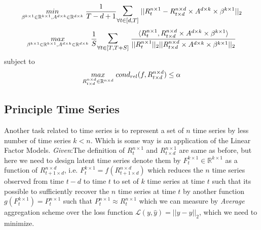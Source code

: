 \begin{equation} \label{lfm_loss}
\underset{\beta^{k \times 1}\in \mathbb{R}^{k\times 1}, A^{d\times k} \in \mathbb{R}^{d\times k}}{min}\hspace{1mm} \frac{1}{T-d+1} \mathlarger{\mathlarger{\sum}}_{\forall t\in [d,T]} \hspace{1mm} ||R^{n\times 1}_t-R^{n\times d}_{t\times d}\times A^{d\times k} \times \beta^{k \times 1}||_2
\end{equation}
\begin{equation} \label{lfm_reward}
\underset{\beta^{k \times 1}\in \mathbb{R}^{k\times 1}, A^{d\times k} \in \mathbb{R}^{d\times k}}{max}\hspace{1mm} \frac{1}{S} \mathlarger{\mathlarger{\sum}}_{\forall t\in [T,T+S]} \hspace{1mm} \frac{\langle R^{n\times 1}_t,R^{n\times d}_{t\times d}\times A^{d\times k} \times \beta^{k \times 1}\rangle}{||R^{n\times 1}_t||_2||R^{n\times d}_{t\times d}\times A^{d\times k} \times \beta^{k \times 1}||_2}
\end{equation}
subject to
\begin{equation} \label{lfm_cond}
\underset{R^{n\times d}_{t\times d} \in \mathbb{R}^{n\times d}}{max}\hspace{1mm} cond_{rel}(f,R^{n\times d}_{t\times d}) \le \alpha
\end{equation}
\newline
\subsection{Principle Time Series}
Another task related to time series is to represent a set of $n$ time series by less number of time series $k<n$. Which is some way is an application of the Linear Factor Models.\newline
\textit{Given}:\newline The definition of $R^{n\times 1}_t$ and  $R^{n\times 1}_{t\times d}$ are same as before, but here we need to design latent time series denote them by $F^{k\times 1}_t \in \mathbb{R}^{k\times 1}$ as a function of $R^{n\times d}_{t+1\times d}$, i.e. $F^{k\times 1}_t = f(R^{n\times d}_{t+1\times d})$ which reduces the $n$ time series observed from time $t-d$ to time $t$ to set of $k$ time series at time $t$ such that its possible to sufficiently recover the $n$ time series at time $t$ by another function $ g(F^{k\times 1}_t) = P^{n \times 1}_{t}$ such that $P^{n \times 1}_{t} \approx R^{n \times 1}_{t}$ which we can measure by \textit{Average} aggregation scheme over the loss function $\mathcal{L}(y,\hat{y}) = ||y-\hat{y}||_2$, which we need to minimize.

